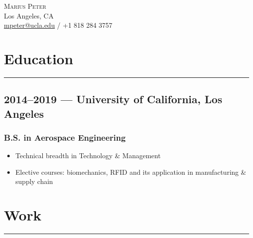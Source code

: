 \documentclass[10pt]{article}
\begin{document}
\renewcommand\labelitemi{-}
\begin{center}
    \huge \textsc{Marius Peter}\\[0.2cm]

    \normalsize
    Los Angeles, CA\\
    \href{mailto:mpeter@ucla.edu}{mpeter@ucla.edu} / +1 818 284 3757\\
\end{center}


\section*{Education}
\rule{\linewidth}{1pt}
\subsection*{2014--2019 --- University of California, Los Angeles}
\subsubsection*{B.S. in Aerospace Engineering}
\begin{itemize}
    \item Technical breadth in Technology \& Management
    \item Elective courses: biomechanics, RFID and its application in manufacturing \& supply chain
\end{itemize}

\section*{Work}
\rule{\linewidth}{1pt}\\
\end{document}

